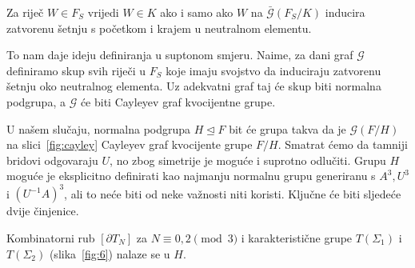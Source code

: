 \documentclass[11pt]{scrartcl}
\begin{document}
\begin{propozicija}
Za riječ $W\in F_S$ vrijedi $W \in K$ ako i samo ako $W$ na $\bar{\mathcal{G}}(F_S/K)$ inducira zatvorenu šetnju s početkom i krajem u neutralnom elementu.
\end{propozicija}
\noindent To nam daje ideju definiranja u suptonom smjeru. Naime, za dani graf $\mathcal{G}$ definiramo skup svih riječi u $F_S$ koje imaju svojstvo da induciraju zatvorenu šetnju oko neutralnog elementa. Uz adekvatni graf taj će skup biti normalna podgrupa, a $\mathcal{G}$ će biti Cayleyev graf kvocijentne grupe.

U našem slučaju, normalna podgrupa $H \unlhd F$ bit će grupa takva da je $\mathcal{G}(F/H)$ na slici~\ref{fig:cayley} Cayleyev graf kvocijente grupe $F/H$. Smatrat ćemo da tamniji bridovi odgovaraju $U$, no zbog simetrije je moguće i suprotno odlučiti. Grupu $H$ moguće je eksplicitno definirati kao najmanju normalnu grupu generiranu s $A^3, U^3$ i $(U^{-1}A)^3$, ali to neće biti od neke važnosti niti koristi. Ključne će biti sljedeće dvije činjenice.
\begin{propozicija} \label{uH}
Kombinatorni rub $[\partial T_N]$ za $N \equiv 0,2 \pmod{3}$ i karakteristične grupe $T(\Sigma_1)$ i $T(\Sigma_2)$ (slika~\ref{fig:6}) nalaze se u $H$.
\end{propozicija}
\end{document}
